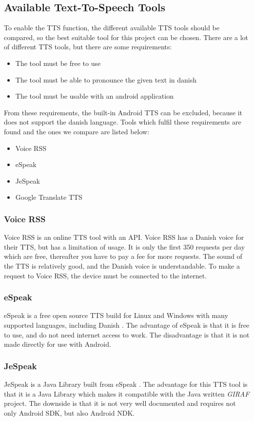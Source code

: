 \subsection{Available Text-To-Speech Tools}
\label{sec:ttstool}
To enable the TTS function, the different available TTS tools should be compared, so the best suitable tool for this project can be chosen.
There are a lot of different TTS tools, but there are some requirements:
\begin{itemize}
	\item The tool must be free to use
	\item The tool must be able to pronounce the given text in danish
	\item The tool must be usable with an android application
\end{itemize}
From these requirements, the built-in Android TTS can be excluded, because it does not support the danish language.
Tools which fulfil these requirements are found and the ones we compare are listed below:
\begin{itemize}
	\item Voice RSS
	\item eSpeak
	\item JeSpeak
	\item Google Translate TTS
\end{itemize}

\subsubsection{Voice RSS}
Voice RSS \citep{voicerss} is an online TTS tool with an API. Voice RSS has a Danish voice for their TTS, but has a limitation of usage. It is only the first 350 requests per day which are free, thereafter you have to pay a fee for more requests. The sound of the TTS is relatively good, and the Danish voice is understandable. To make a request to Voice RSS, the device must be connected to the internet.

\subsubsection{eSpeak}
eSpeak is a free open source TTS build for Linux and Windows with many supported languages, including Danish \citep{espeak}. The advantage of eSpeak is that it is free to use, and do not need internet access to work. The disadvantage is that it is not made directly for use with Android. 

\subsubsection{JeSpeak}
JeSpeak is a Java Library built from eSpeak \citep{jespeak}. The advantage for this TTS tool is that it is a Java Library which makes it compatible with the Java written \textit{GIRAF} project. The downside is that it is not very well documented and requires not only Android SDK, but also Android NDK.

